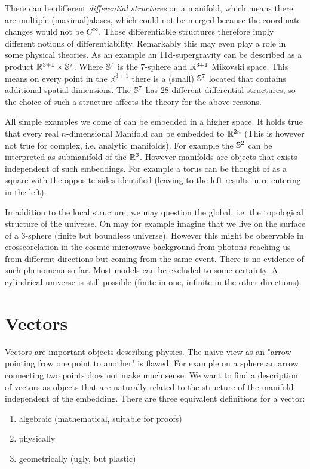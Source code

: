 \begin{sidenote}
There can be different \emph{differential structures} on a manifold, 
which means there are multiple (maximal)alases, which
could not be merged because the coordinate changes would not be $C^\infty$. Those differentiable structures therefore imply different notions of differentiability. 
Remarkably this may even play a role in some physical theories. 
As an example an 11d-supergravity can be described as a product
$\mathbb{R}^{3+1}\times \mathbb{S}^7$.
Where $\mathbb{S}^7$ is the 7-sphere and $\mathbb{R}^{3+1}$ Mikovski space.
This means on every point in the $\mathbb{R}^{3+1}$ there is a (small) $\mathbb{S}^7$  located that contains additional spatial dimensions. 
The $\mathbb{S}^7$ has 28 different differential structures, so the choice of
such a structure affects the theory for the above reasons.
\end{sidenote}
All simple examples we come of can be embedded in a higher space. It holds true
that every real $n$-dimensional Manifold can be embedded to $\mathbb{R}^{2n}$
(This is however not true for complex, i.e. analytic manifolds).
For example the $\mathbb{S}^2$ can be interpreted as submanifold of the $\mathbb{R}^3$.
However manifolds are objects that exists independent of such embeddings. 
For example a torus can be thought of as a square with the opposite sides identified (leaving to the left results in re-entering in the left).
\begin{sidenote}
In addition to the local structure, we may question the global, i.e. the
topological structure of the universe.
On may for example imagine that we live on the surface of a 3-sphere (finite but boundless universe). 
However this might be observable in crosscorelation in the cosmic microwave background from photons reaching us 
from different directions but coming from the same event. There is no evidence of such phenomena so far. 
Most models can be excluded to some certainty. A cylindrical
universe is still possible (finite in one, infinite in the
other directions).
\end{sidenote}
\section{Vectors}
Vectors are important objects describing physics. The naive view as an "arrow pointing frow one point to another" is flawed. 
For example on a sphere an arrow connecting two points does not make much sense.
We want to find a description of vectors as objects that are naturally related to the structure of the manifold independent of the embedding.
There are three equivalent definitions for a vector:
\begin{enumerate}
    \item algebraic (mathematical, suitable for proofs)
    \item physically
    \item geometrically (ugly, but plastic)
\end{enumerate}
